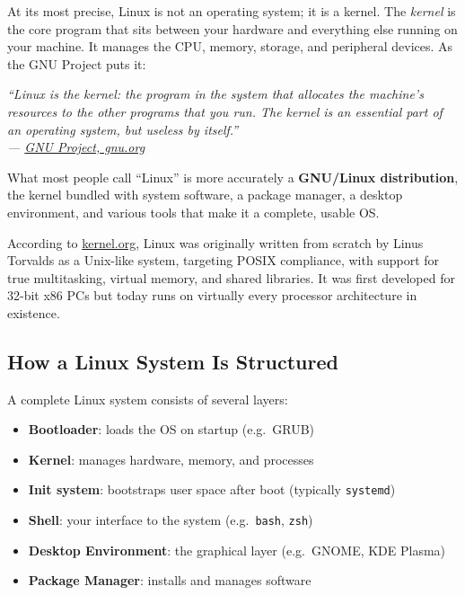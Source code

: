 \documentclass{article}
\newcommand{\code}[1]{\colorbox{codebg}{\texttt{#1}}}
\begin{document}
At its most precise, Linux is not an operating system; it is a kernel. The \textit{kernel} is the core program that sits between your hardware and everything else running on your machine. It manages the CPU, memory, storage, and peripheral devices. As the GNU Project puts it:

\begin{mdframed}[linewidth=1.5pt, linecolor=black!50, topline=true, bottomline=true,
  leftline=false, rightline=false, backgroundcolor=black!3]
  \small\itshape
  ``Linux is the kernel: the program in the system that allocates the machine's resources to the other programs that you run. The kernel is an essential part of an operating system, but useless by itself.''\\[4pt]
  \normalfont\small --- \href{https://www.gnu.org/gnu/linux-and-gnu.en.html}{GNU Project, gnu.org}
\end{mdframed}

\noindent What most people call ``Linux'' is more accurately a \textbf{GNU/Linux distribution}, the kernel bundled with system software, a package manager, a desktop environment,
and various tools that make it a complete, usable OS.

According to \href{https://www.kernel.org/linux.html}{kernel.org}, Linux was originally written from scratch by Linus Torvalds as a Unix-like system, targeting POSIX compliance, with support for true multitasking, virtual memory, and shared libraries. It was first developed for 32-bit x86 PCs but today runs on virtually every processor architecture in existence.

\subsection{How a Linux System Is Structured}

A complete Linux system consists of several layers:

\begin{itemize}[leftmargin=1.5em, nosep, label={\tiny\textbullet}]
  \item \textbf{Bootloader}: loads the OS on startup (e.g.\ GRUB)
  \item \textbf{Kernel}: manages hardware, memory, and processes
  \item \textbf{Init system}: bootstraps user space after boot (typically \code{systemd})
  \item \textbf{Shell}: your interface to the system (e.g.\ \code{bash}, \code{zsh})
  \item \textbf{Desktop Environment}: the graphical layer (e.g.\ GNOME, KDE Plasma)
  \item \textbf{Package Manager}: installs and manages software
\end{itemize}
\end{document}
